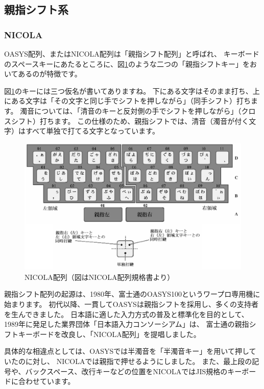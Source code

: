 \subsection{親指シフト系}
\subsubsection*{NICOLA}

OASYS配列、またはNICOLA配列は「親指シフト配列」と呼ばれ、
キーボードのスペースキーにあたるところに、図\ref{fig:nicola}のような二つの「親指シフトキー」をおいてあるのが特徴です。

図\ref{fig:nicola}のキーには三つ仮名が書いてありますね。
下にある文字はそのまま打ち、上にある文字は「その文字と同じ手でシフトを押しながら」（同手シフト）打ちます。
濁音については、「清音のキーと反対側の手でシフトを押しながら」（クロスシフト）打ちます。
この仕様のため、親指シフトでは、清音（濁音が付く文字）はすべて単独で打てる文字となっています。

\begin{figure}[htbp]
 \begin{center}
  \includegraphics[width=0.8\hsize]{nicola.eps}
 \end{center}
 \caption{NICOLA配列（図はNICOLA配列規格書より）}
 \label{fig:nicola}
\end{figure}

親指シフト配列の起源は、1980年、富士通のOASYS100というワープロ専用機に始まります。
初代以降、一貫してOASYSは親指シフトを採用し、多くの支持者を生んできました。
日本語に適した入力方式の普及と標準化を目的として、1989年に発足した業界団体「日本語入力コンソーシアム」は、
富士通の親指シフトキーボードを改良し、「NICOLA配列」を提唱しました。

具体的な相違点としては、OASYSでは半濁音を「半濁音キー」を用いて押していたのに対し、
NICOLAでは親指で押せるようにしました。
また、最上段の記号や、バックスペース、改行キーなどの位置をNICOLAではJIS規格のキーボードに合わせています。

